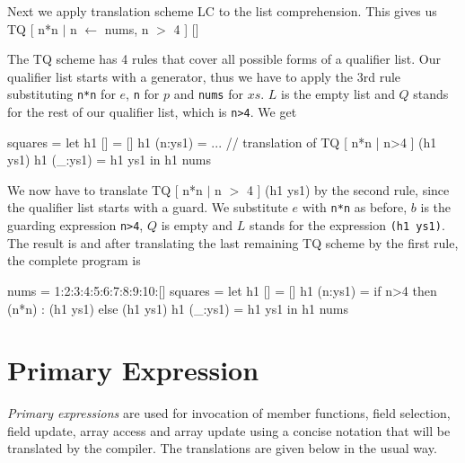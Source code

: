 Next we apply translation scheme LC to the list comprehension. This gives us\\
TQ [ n*n $|$ n $\leftarrow$ nums, n $>$ 4 ] []

The TQ scheme has 4 rules that cover all possible forms of a qualifier list. Our qualifier list starts with a generator, thus we have to apply the 3rd rule substituting \texttt{n*n} for $e$, \texttt{n} for $p$ and \texttt{nums} for $xs$. $L$ is the empty list and $Q$ stands for the rest of our qualifier list, which is \texttt{n>4}.
We get

\begin{code}
squares = let
   h1 [] = []
   h1 (n:ys1) = ... // translation of TQ [ n*n | n>4 ] (h1 ys1)
   h1 (_:ys1) = h1 ys1
 in h1 nums
\end{code}

We now have to translate TQ [ n*n $|$ n $>$ 4 ] (h1 ys1) by the second rule, since the qualifier list starts with a guard. We substitute $e$ with \texttt{n*n} as before, $b$ is the guarding expression \texttt{n>4}, $Q$ is empty and $L$ stands for the expression \texttt{(h1 ys1)}.
The result is 
and after translating the last remaining TQ scheme by the first rule, the complete program is

\begin{code}
nums = 1:2:3:4:5:6:7:8:9:10:[]
squares = let
   h1 [] = []
   h1 (n:ys1) = if n>4 then (n*n) : (h1 ys1) else (h1 ys1)
   h1 (_:ys1) = h1 ys1
 in h1 nums
\end{code}

\section{Primary Expression} \label{primexp} 

\emph{Primary expressions} are used for invocation of member functions, field selection, field update, array access and array update using a concise notation that will be translated by the compiler. The translations are given below in the usual way.

